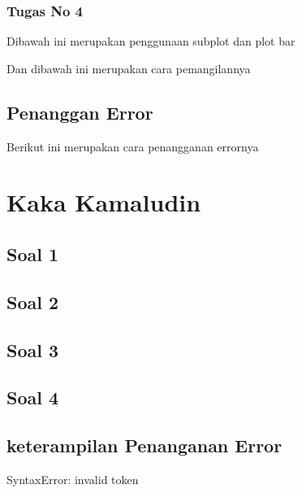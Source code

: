\subsubsection{Tugas No 4}

\hfill \break

Dibawah ini merupakan penggunaan subplot dan plot bar

Dan dibawah ini merupakan cara pemangilannya



\subsection{Penanggan Error}

\hfill \break

Berikut ini merupakan cara penangganan errornya


\section{Kaka Kamaludin}
\subsection{Soal 1}

\subsection{Soal 2}

\subsection{Soal 3}

\subsection{Soal 4}

\subsection{keterampilan Penanganan Error}
SyntaxError: invalid token

